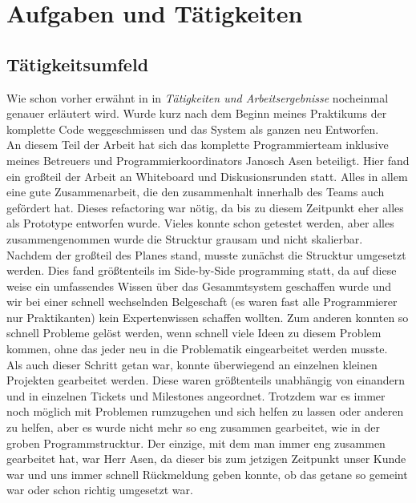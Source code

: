 \section{Aufgaben und Tätigkeiten}

\subsection{Tätigkeitsumfeld}

Wie schon vorher erwähnt in in \emph{Tätigkeiten und Arbeitsergebnisse} nocheinmal genauer erläutert wird. Wurde kurz nach dem Beginn meines Praktikums der komplette Code weggeschmissen und das System als ganzen neu Entworfen.\\
An diesem Teil der Arbeit hat sich das komplette Programmierteam inklusive meines Betreuers und Programmierkoordinators Janosch Asen beteiligt. Hier fand ein großteil der Arbeit an Whiteboard und Diskusionsrunden statt. Alles in allem eine gute Zusammenarbeit, die den zusammenhalt innerhalb des Teams auch gefördert hat. Dieses refactoring war nötig, da bis zu diesem Zeitpunkt eher alles als Prototype entworfen wurde. Vieles konnte schon getestet werden, aber alles zusammengenommen wurde die Strucktur grausam und nicht skalierbar.\\

Nachdem der großteil des Planes stand, musste zunächst die Strucktur umgesetzt werden. Dies fand größtenteils im Side-by-Side programming statt, da auf diese weise ein umfassendes Wissen über das Gesammtsystem geschaffen wurde und wir bei einer schnell wechselnden Belgeschaft (es waren fast alle Programmierer nur Praktikanten) kein Expertenwissen schaffen wollten. Zum anderen konnten so schnell Probleme gelöst werden, wenn schnell viele Ideen zu diesem Problem kommen, ohne das jeder neu in die Problematik eingearbeitet werden musste.\\


Als auch dieser Schritt getan war, konnte überwiegend an einzelnen kleinen Projekten gearbeitet werden. Diese waren größtenteils unabhängig von einandern und in einzelnen Tickets und Milestones angeordnet. Trotzdem war es immer noch möglich mit Problemen rumzugehen und sich helfen zu lassen oder anderen zu helfen, aber es wurde nicht mehr so eng zusammen gearbeitet, wie in der groben Programmstrucktur. Der einzige, mit dem man immer eng zusammen gearbeitet hat, war Herr Asen, da dieser bis zum jetzigen Zeitpunkt unser Kunde war und uns immer schnell Rückmeldung geben konnte, ob das getane so gemeint war oder schon richtig umgesetzt war.


